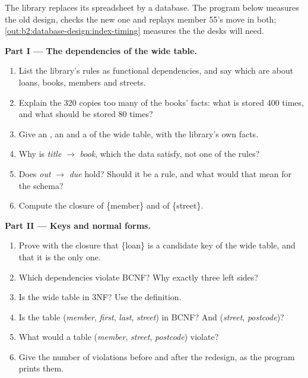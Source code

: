 \begin{problem}\label{pb:b2:database-design:1}
The library replaces its spreadsheet by a database. The program below measures the old design, checks the new one and
replays member 55's move in both; \cref{out:b2:database-design:index-timing} measures the  the desks will need.

\label{lst:b2:database-design:problem}

\label{out:b2:database-design:problem}

\medskip\noindent\textbf{Part I --- The dependencies of the wide table.}\par\nopagebreak
\begin{enumerate}
\item List the library's rules as functional dependencies, and say which are about loans, books, members and streets.
\item Explain the 320 copies too many of the books' facts: what is stored 400 times, and what should be stored 80 times?
\item Give an , an  and a  of the wide table, with the library's own
facts.
\item Why is \emph{title} $\to$ \emph{book}, which the data satisfy, not one of the rules?
\item Does \emph{out} $\to$ \emph{due} hold? Should it be a rule, and what would that mean for the schema?
\item Compute the closure of \{member\} and of \{street\}.
\end{enumerate}

\medskip\noindent\textbf{Part II --- Keys and normal forms.}\par\nopagebreak
\begin{enumerate}[resume, beginpenalty=10000]
\item Prove with the closure that \{loan\} is a candidate key of the wide table, and that it is the only one.
\item Which dependencies violate BCNF? Why exactly three left sides?
\item Is the wide table in 3NF? Use the definition.
\item Is the table (\emph{member}, \emph{first}, \emph{last}, \emph{street}) in BCNF? And (\emph{street},
\emph{postcode})?
\item What would a table (\emph{member}, \emph{street}, \emph{postcode}) violate?
\item Give the number of violations before and after the redesign, as the program prints them.
\end{enumerate}


\end{problem}
